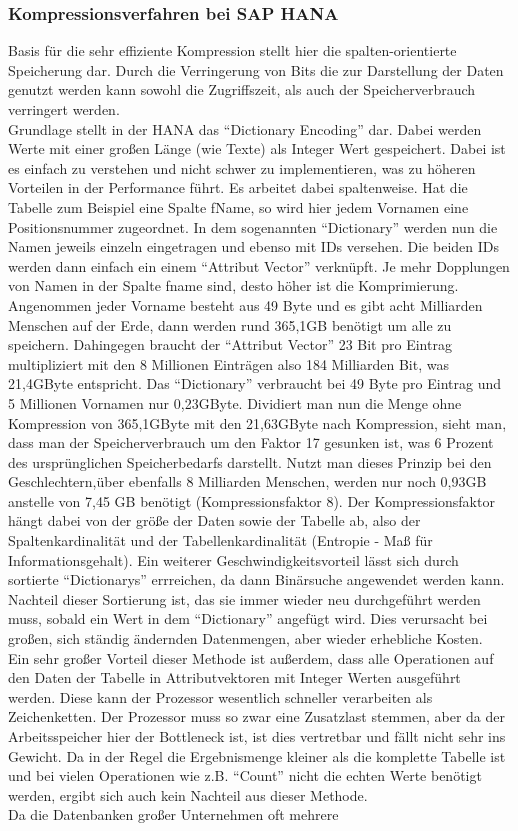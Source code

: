 \documentclass[a4paper, 12pt]{scrartcl}
\begin{document}
\subsubsection{Kompressionsverfahren bei SAP HANA}
Basis für die sehr effiziente Kompression stellt hier die spalten-orientierte Speicherung dar. Durch die Verringerung von Bits die zur Darstellung der Daten genutzt werden kann sowohl die Zugriffszeit, als auch der Speicherverbrauch verringert werden.\\
Grundlage stellt in der HANA das "`Dictionary Encoding"' dar. Dabei werden Werte mit einer großen Länge (wie Texte) als Integer Wert gespeichert. Dabei ist es einfach zu verstehen und nicht schwer zu implementieren, was zu höheren Vorteilen in der Performance führt. Es arbeitet dabei spaltenweise. Hat die Tabelle zum Beispiel eine Spalte fName, so wird hier jedem Vornamen eine Positionsnummer zugeordnet. In dem sogenannten "`Dictionary"' werden nun die Namen jeweils einzeln eingetragen und ebenso mit IDs versehen. Die beiden IDs werden dann einfach ein einem "`Attribut Vector"' verknüpft. Je mehr Dopplungen von Namen in der Spalte fname sind, desto höher ist die Komprimierung. Angenommen jeder Vorname besteht aus 49 Byte und es gibt acht Milliarden Menschen auf der Erde, dann werden rund 365,1GB benötigt um alle zu speichern. Dahingegen braucht der "`Attribut Vector"' 23 Bit pro Eintrag multipliziert mit den 8 Millionen Einträgen also 184 Milliarden Bit, was 21,4GByte entspricht. Das "`Dictionary"' verbraucht bei 49 Byte pro Eintrag  und 5 Millionen Vornamen nur 0,23GByte. Dividiert man nun die Menge ohne Kompression von 365,1GByte mit den 21,63GByte nach Kompression, sieht man, dass man der Speicherverbrauch um den Faktor 17 gesunken ist, was 6 Prozent des ursprünglichen Speicherbedarfs darstellt. Nutzt man dieses Prinzip bei den Geschlechtern,über ebenfalls 8 Milliarden Menschen, werden nur noch 0,93GB anstelle von 7,45 GB benötigt (Kompressionsfaktor 8). Der Kompressionsfaktor hängt dabei von der größe der Daten sowie der Tabelle ab, also der Spaltenkardinalität und der Tabellenkardinalität (Entropie - Maß für Informationsgehalt). Ein weiterer Geschwindigkeitsvorteil lässt sich durch sortierte "`Dictionarys"' errreichen, da dann Binärsuche angewendet werden kann. Nachteil dieser Sortierung ist, das sie immer wieder neu durchgeführt werden muss, sobald ein Wert in dem "`Dictionary"' angefügt wird. Dies verursacht bei großen, sich ständig ändernden Datenmengen, aber wieder erhebliche Kosten. \\ Ein sehr großer Vorteil dieser Methode ist außerdem, dass alle Operationen auf den Daten der Tabelle in Attributvektoren mit Integer Werten ausgeführt werden. Diese kann der Prozessor wesentlich schneller verarbeiten als Zeichenketten. Der Prozessor muss so zwar eine Zusatzlast stemmen, aber da der Arbeitsspeicher hier der Bottleneck ist, ist dies vertretbar und fällt nicht sehr ins Gewicht. Da in der Regel die Ergebnismenge kleiner als die komplette Tabelle ist und bei vielen Operationen wie z.B. "`Count"' nicht die echten Werte benötigt werden, ergibt sich auch kein Nachteil aus dieser Methode. \\ Da die Datenbanken großer Unternehmen oft mehrere 
\end{document}
